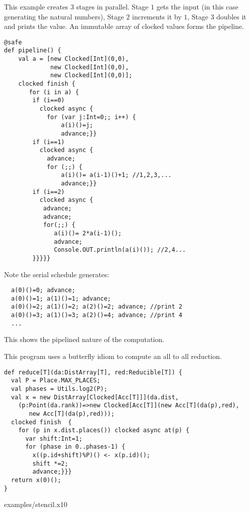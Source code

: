 \begin{example}[Pipeline]
This example creates $3$ stages in parallel. Stage $1$ gets the input
(in this case generating the natural numbers), Stage $2$ increments it
by $1$, Stage $3$ doubles it and prints the value. An immutable array of 
clocked values forms the pipeline.
\begin{lstlisting}
@safe
def pipeline() {
    val a = [new Clocked[Int](0,0),
             new Clocked[Int](0,0),
             new Clocked[Int](0,0)];
    clocked finish {
       for (i in a) {
        if (i==0) 
          clocked async {
            for (var j:Int=0;; i++) {
                a(i)()=j;
                advance;}}
        if (i==1)
          clocked async {
            advance;
            for (;;) {
                a(i)()= a(i-1)()+1; //1,2,3,...
                advance;}}
        if (i==2) 
          clocked async {
           advance;
           advance;
           for(;;) {
              a(i)()= 2*a(i-1)();
              advance;
              Console.OUT.println(a(i)()); //2,4...
        }}}}}
  \end{lstlisting}
Note the serial schedule generates:
\begin{lstlisting}
  a(0)()=0; advance;
  a(0)()=1; a(1)()=1; advance;
  a(0)()=2; a(1)()=2; a(2)()=2; advance; //print 2
  a(0)()=3; a(1)()=3; a(2)()=4; advance; //print 4
  ...
\end{lstlisting}
\noindent This shows the pipelined nature of the computation. 
\end{example}

\begin{example}
This program uses a butterfly idiom to compute an all to all
reduction.
\begin{lstlisting}
def reduce[T](da:DistArray[T], red:Reducible[T]) {
  val P = Place.MAX_PLACES;
  val phases = Utils.log2(P);
  val x = new DistArray[Clocked[Acc[T]]](da.dist,
    (p:Point(da.rank))=>new Clocked[Acc[T]](new Acc[T](da(p),red),
       new Acc[T](da(p),red)));
  clocked finish  {
    for (p in x.dist.places()) clocked async at(p) {
      var shift:Int=1;
      for (phase in 0..phases-1) {
        x((p.id+shift)%P)() <- x(p.id)();
        shift *=2;
        advance;}}}
  return x(0)();
}
\end{lstlisting}
\end{example}

 {examples/stencil.x10}
